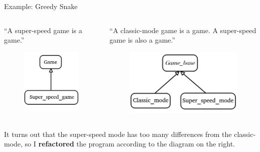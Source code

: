 \documentclass{beamer}
\begin{document}
\begin{frame}{Example: Greedy Snake}
    \begin{columns}
        \begin{column}{0.5\linewidth}
            ``A super-speed game is a game.''
            \begin{figure}[h]
                \centering
                \includegraphics[scale=0.5]{img/snake_original.png}
            \end{figure}
        \end{column}
        \begin{column}{0.5\linewidth}
            ``A classic-mode game is a game. A super-speed game is also a game.''
            \begin{figure}[h]
                \centering
                \includegraphics[width=\textwidth]{img/snake_new.png}
            \end{figure}
        \end{column}
    \end{columns}
    It turns out that the super-speed mode has too many differences from the classic-mode, so I \textbf{refactored} the program according to the diagram on the right.
\end{frame}
\end{document}
